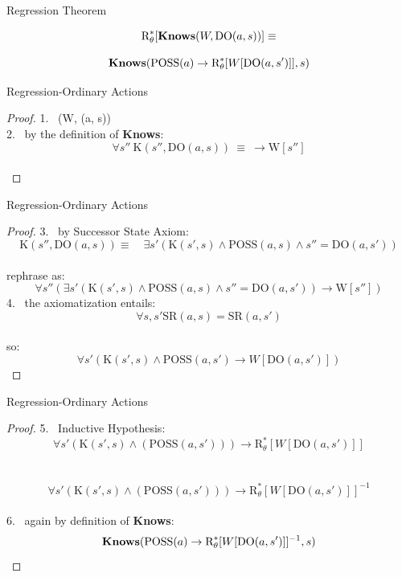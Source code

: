 \begin{frame}{Regression Theorem}

\begin{theorem}

    \[ \text{R}^*_{\theta}[\textbf{Knows}(W, \text{DO}(a, s))] \equiv \]
        
    \[ \textbf{Knows}(\text{POSS}(a) \rightarrow \text{R}^*_{\theta}[W[\text{DO}(a, s')]], s) \]

\end{theorem}    
\end{frame}

\begin{frame}{Regression-Ordinary Actions}

    \begin{proof}  
       1. \ \knows(W, (a, s)) \\
       2. \ by the definition of \textbf{Knows}: \ \[ \forall s'' \  \text{K}(s'', \text{DO}(a, s)) \ \equiv \ \rightarrow \text{W}[s''] \] \\
    \end{proof} 
\end{frame}    
\begin{frame}{Regression-Ordinary Actions}

    \begin{proof}  
       3. \ by Successor State Axiom: \[ \text{K}(s'', \text{DO}(a, s)) \equiv \quad \exists s'(\text{K}(s',s) \land \text{POSS}(a, s) \land s'' = \text{DO}(a, s'))\] \\
       rephrase as: \[ \forall s''(\exists s'(\text{K}(s',s) \land \text{POSS}(a, s) \land s'' = \text{DO}(a, s')) \rightarrow \text{W}[s''])  \]
       4. \ the axiomatization entails: \[ \forall s,s' \text{SR}(a, s) = \text{SR}(a, s') \] \\
       so: \[ \forall s'(\text{K}(s',s) \land \text{POSS}(a, s') \rightarrow W[\text{DO}(a, s')]) \]
    \end{proof} 

\end{frame}

\begin{frame}{Regression-Ordinary Actions}

    \begin{proof}  
       5. \ Inductive Hypothesis: \[ \forall s'(\text{K}(s',s) \land (\text{POSS}(a, s'))) \rightarrow \text{R}^*_{\theta}[W[\text{DO}(a, s')]] \] \\
          \ \[ \forall s'(\text{K}(s',s) \land (\text{POSS}(a, s'))) \rightarrow \text{R}^*_{\theta}[W[\text{DO}(a, s')]]^{-1} \] \\
       
       6. \ again by definition of \textbf{Knows}: \  \[ \textbf{Knows}(\text{POSS}(a) \rightarrow \text{R}^*_{\theta}[W[\text{DO}(a, s')]]^{-1}, s) \]
    \end{proof} 

\end{frame}


